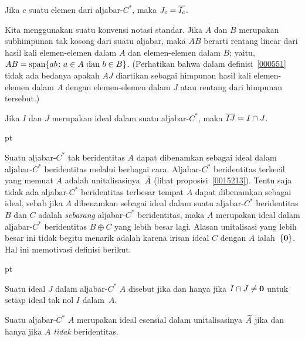 \begin{prop} Jika $c$ suatu elemen dari aljabar-$C^*$, maka $J_c = \overline{I_c}$.
\end{prop}

\begin{notn} Kita menggunakan suatu konvensi notasi standar. Jika $A$ dan $B$ merupakan subhimpunan tak kosong
dari suatu aljabar, maka $AB$ berarti rentang linear dari hasil kali elemen-elemen dalam $A$ dan
elemen-elemen dalam $B$; yaitu,
$AB = \operatorname{span}\{ab \colon \text{$a \in A$ dan $b \in B$}\}$. (Perhatikan bahwa dalam
definisi~\ref{000551} tidak ada bedanya apakah $AJ$ diartikan sebagai himpunan
hasil kali elemen-elemen dalam $A$ dengan elemen-elemen dalam $J$ atau rentang dari himpunan tersebut.)
\end{notn}

\begin{prop} Jika $I$ dan $J$ merupakan ideal dalam suatu aljabar-$C^*$, maka $\overline{IJ} =
I \cap J$.
\end{prop}

 pt

Suatu aljabar-$C^*$ tak beridentitas $A$ dapat dibenamkan sebagai ideal dalam aljabar-$C^*$ beridentitas melalui
berbagai cara. Aljabar-$C^*$ beridentitas terkecil yang memuat $A$ adalah unitalisasinya~$\widetilde{A}$ (lihat proposisi~\ref{0015213}). Tentu saja tidak ada aljabar-$C^*$ beridentitas terbesar tempat
$A$ dapat dibenamkan sebagai ideal, sebab jika $A$ dibenamkan sebagai ideal dalam suatu
aljabar-$C^*$ beridentitas $B$ dan $C$ adalah \emph{sebarang} aljabar-$C^*$ beridentitas, maka $A$ merupakan ideal dalam
aljabar-$C^*$ beridentitas $B \oplus C$ yang lebih besar lagi. Alasan unitalisasi yang lebih besar ini
tidak begitu menarik adalah karena irisan ideal $C$ dengan $A$ ialah~$\{\mathbf{0}\}$.
Hal ini memotivasi definisi berikut.

 pt

\begin{defn} Suatu ideal $J$ dalam aljabar-$C^*$ $A$ disebut
 jika dan hanya jika $I \cap J \ne \mathbf{0}$ untuk setiap ideal tak nol $I$ dalam~$A$.
\end{defn}

\begin{exam} Suatu aljabar-$C^*$ $A$ merupakan ideal esensial dalam unitalisasinya $\widetilde{A}$ jika dan
hanya jika $A$ \emph{tidak} beridentitas.
\end{exam}

